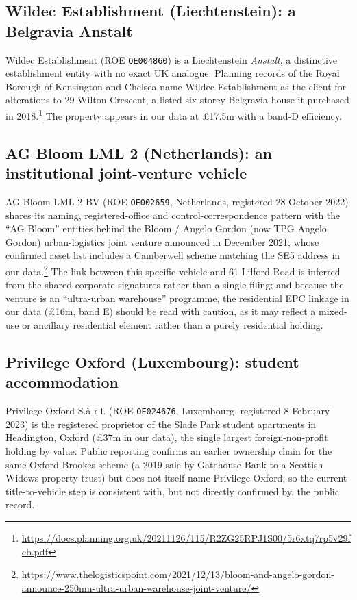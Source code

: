 \documentclass[11pt]{article}
\begin{document}
\subsection{Wildec Establishment (Liechtenstein): a Belgravia Anstalt}

Wildec Establishment (ROE \texttt{OE004860}) is a Liechtenstein \emph{Anstalt}, a
distinctive establishment entity with no exact UK analogue. Planning records of
the Royal Borough of Kensington and Chelsea name Wildec Establishment as the
client for alterations to 29 Wilton Crescent, a listed six-storey Belgravia house
it purchased in
2018.\footnote{\url{https://docs.planning.org.uk/20211126/115/R2ZG25RPJ1S00/5r6xtq7rp5v29fcb.pdf}}
The property appears in our data at \pounds{}17.5m with a band-D efficiency.

\subsection{AG Bloom LML 2 (Netherlands): an institutional joint-venture vehicle}

AG Bloom LML 2 BV (ROE \texttt{OE002659}, Netherlands, registered 28 October 2022)
shares its naming, registered-office and control-correspondence pattern with the
``AG Bloom'' entities behind the Bloom / Angelo Gordon (now TPG Angelo Gordon)
urban-logistics joint venture announced in December 2021, whose confirmed asset
list includes a Camberwell scheme matching the SE5 address in our
data.\footnote{\url{https://www.thelogisticspoint.com/2021/12/13/bloom-and-angelo-gordon-announce-250mn-ultra-urban-warehouse-joint-venture/}}
The link between this specific vehicle and 61 Lilford Road is inferred from the
shared corporate signatures rather than a single filing; and because the venture
is an ``ultra-urban warehouse'' programme, the residential EPC linkage in our data
(\pounds{}16m, band E) should be read with caution, as it may reflect a mixed-use
or ancillary residential element rather than a purely residential holding.

\subsection{Privilege Oxford (Luxembourg): student accommodation}

Privilege Oxford S.\`a r.l. (ROE \texttt{OE024676}, Luxembourg, registered 8
February 2023) is the registered proprietor of the Slade Park student apartments
in Headington, Oxford (\pounds{}37m in our data), the single largest
foreign-non-profit holding by value. Public reporting confirms an earlier
ownership chain for the same Oxford Brookes scheme (a 2019 sale by Gatehouse Bank
to a Scottish Widows property trust) but does not itself name Privilege Oxford, so
the current title-to-vehicle step is consistent with, but not directly confirmed
by, the public record.
\end{document}
